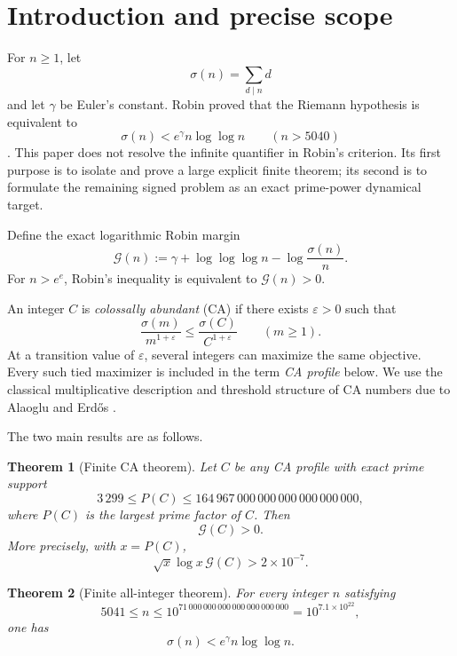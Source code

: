 \documentclass[11pt,a4paper]{article}
\numberwithin{equation}{section}
\newtheorem{theorem}{Theorem}
\theoremstyle{definition}
\newcommand{\Xmin}{3\,299}
\newcommand{\Xmax}{164\,967\,000\,000\,000\,000\,000\,000}
\newcommand{\Kcut}{71\,000\,000\,000\,000\,000\,000\,000}
\newcommand{\Ggap}{\mathcal G}
\begin{document}
\begin{abstract}
All calculations used in the two finite theorems use deterministic sieves,
exact integer arithmetic, and outward-rounded arbitrary-precision decimal
intervals.  The source and report hashes are recorded.  The conclusion is
finite: it neither proves Robin's inequality for all integers nor proves the
Riemann hypothesis.
\end{abstract}

\section{Introduction and precise scope}

For \(n\ge1\), let
\[
  \sigma(n)=\sum_{d\mid n}d
\]
and let \(\gamma\) be Euler's constant.  Robin proved that the Riemann
hypothesis is equivalent to
\[
  \sigma(n)<e^\gamma n\log\log n
  \qquad(n>5040)
\]
\cite{robin1984}.  This paper does not resolve the infinite quantifier in
Robin's criterion.  Its
first purpose is to isolate and prove a large explicit finite theorem; its
second is to formulate the remaining signed problem as an exact prime-power
dynamical target.

Define the exact logarithmic Robin margin
\begin{equation}\label{eq:G-def}
  \Ggap(n)
  :=
  \gamma+\log\log\log n-\log\frac{\sigma(n)}n.
\end{equation}
For \(n>e^e\), Robin's inequality is equivalent to
\(\Ggap(n)>0\).

An integer \(C\) is \emph{colossally abundant} (CA) if there exists
\(\varepsilon>0\) such that
\[
  \frac{\sigma(m)}{m^{1+\varepsilon}}
  \le
  \frac{\sigma(C)}{C^{1+\varepsilon}}
  \qquad(m\ge1).
\]
At a transition value of \(\varepsilon\), several integers can maximize the
same objective.  Every such tied maximizer is included in the term
\emph{CA profile} below.  We use the classical multiplicative description and
threshold structure of CA numbers due to Alaoglu and Erd\H{o}s
\cite{alaogluerdos1944}.

The two main results are as follows.

\begin{theorem}[Finite CA theorem]\label{thm:finite-ca}
Let \(C\) be any CA profile with exact prime support
\[
  \Xmin\le P(C)\le\Xmax,
\]
where \(P(C)\) is the largest prime factor of \(C\).  Then
\[
  \Ggap(C)>0.
\]
More precisely, with \(x=P(C)\),
\[
  \sqrt{x}\log x\,\Ggap(C)>2\times10^{-7}.
\]
\end{theorem}

\begin{theorem}[Finite all-integer theorem]\label{thm:all-integers}
For every integer \(n\) satisfying
\[
  5041\le n\le10^{\Kcut}
  =10^{7.1\times10^{22}},
\]
one has
\[
  \sigma(n)<e^\gamma n\log\log n.
\]
\end{theorem}
\end{document}
